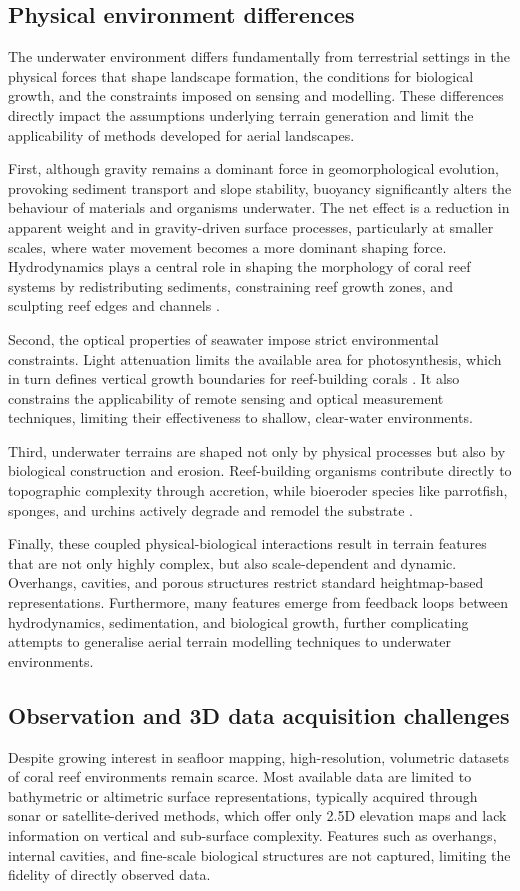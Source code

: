 \subsection{Physical environment differences}
The underwater environment differs fundamentally from terrestrial settings in the physical forces that shape landscape formation, the conditions for biological growth, and the constraints imposed on sensing and modelling. These differences directly impact the assumptions underlying terrain generation and limit the applicability of methods developed for aerial landscapes.

First, although gravity remains a dominant force in geomorphological evolution, provoking sediment transport and slope stability, buoyancy significantly alters the behaviour of materials and organisms underwater. The net effect is a reduction in apparent weight and in gravity-driven surface processes, particularly at smaller scales, where water movement becomes a more dominant shaping force. Hydrodynamics plays a central role in shaping the morphology of coral reef systems by redistributing sediments, constraining reef growth zones, and sculpting reef edges and channels \cite{Lowe2015}.

Second, the optical properties of seawater impose strict environmental constraints. Light attenuation limits the available area for photosynthesis, which in turn defines vertical growth boundaries for reef-building corals \cite{Huston1985}. It also constrains the applicability of remote sensing and optical measurement techniques, limiting their effectiveness to shallow, clear-water environments.

Third, underwater terrains are shaped not only by physical processes but also by biological construction and erosion. Reef-building organisms contribute directly to topographic complexity through accretion, while bioeroder species like parrotfish, sponges, and urchins actively degrade and remodel the substrate \cite{Perry2013}.

Finally, these coupled physical-biological interactions result in terrain features that are not only highly complex, but also scale-dependent and dynamic. Overhangs, cavities, and porous structures restrict standard heightmap-based representations. Furthermore, many features emerge from feedback loops between hydrodynamics, sedimentation, and biological growth, further complicating attempts to generalise aerial terrain modelling techniques to underwater environments.


\subsection{Observation and 3D data acquisition challenges}
Despite growing interest in seafloor mapping, high-resolution, volumetric datasets of coral reef environments remain scarce. Most available data are limited to bathymetric or altimetric surface representations, typically acquired through sonar or satellite-derived methods, which offer only 2.5D elevation maps and lack information on vertical and sub-surface complexity. Features such as overhangs, internal cavities, and fine-scale biological structures are not captured, limiting the fidelity of directly observed data.

